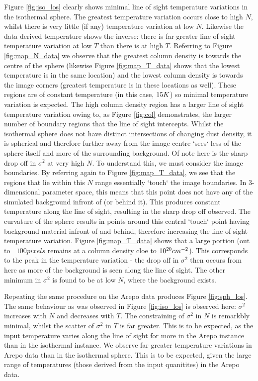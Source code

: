 \documentclass{report}
\begin{document}
Figure \ref{fig:iso_los} clearly shows minimal line of sight temperature variations in the isothermal sphere. The greatest temperature variation occurs close to high $N$, whilst there is very little (if any) temperature variation at low $N$. Likewise the data derived temperature shows the inverse: there is far greater line of sight temperature variation at low $T$ than there is at high $T$. Referring to Figure \ref{fig:map_N_data} we observe that the greatest column density is towards the centre of the sphere (likewise Figure \ref{fig:map_T_data} shows that the lowest temperature is in the same location) and the lowest column density is towards the image corners (greatest temperature is in these locations as well). These regions are of constant temperature (in this case, $15\/K$) so minimal temperature variation is expected. The high column density region has a larger line of sight temperature variation owing to, as Figure \ref{fig:col} demonstrates, the larger number of boundary regions that the line of sight intercepts. Whilst the isothermal sphere does not have distinct intersections of changing dust density, it is spherical and therefore further away from the image centre `sees` less of the sphere itself and more of the surrounding background. Of note here is the sharp drop off in $\sigma^{2}$ at very high $N$. To understand this, we must consider the image boundaries. By referring again to Figure \ref{fig:map_T_data}, we see that the regions that lie within this $N$ range essentially `touch` the image boundaries. In 3-dimensional parameter space, this means that this point does not have any of the simulated background infront of (or behind it). This produces constant temperature along the line of sight, resulting in the sharp drop off observed. The curvature of the sphere results in points around this central `touch` point having background material infront of and behind, therefore increasing the line of sight temperature variation. Figure \ref{fig:map_T_data} shows that a large portion (out to $~$ $100 pixels$ remains at a column density cloe to $10^{20}\/cm^{-2}$). This corresponds to the peak in the temperature variation - the drop off in $\sigma^{2}$ then occurs from here as more of the background is seen along the line of sight. The other minimum in $\sigma^{2}$ is found to be at low $N$, where the background exists.

Repeating the same procedure on the Arepo data produces Figure \ref{fig:sph_los}. The same behaviour as was observed in Figure \ref{fig:iso_los} is observed here: $\sigma^{2}$ increases with $N$ and decreases with $T$. The constraining of $\sigma^{2}$ in $N$ is remarkbly minimal, whilst the scatter of
$\sigma^{2}$ in $T$ is far greater. This is to be expected, as the input temperature varies along the line of sight for more in the Arepo instance than in the isothermal instance. We observe far greater temperature variations in Arepo data than in the isothermal sphere. This is to be expected, given the large range of temperatures (those derived from the input quanitites) in the Arepo data.
\end{document}
